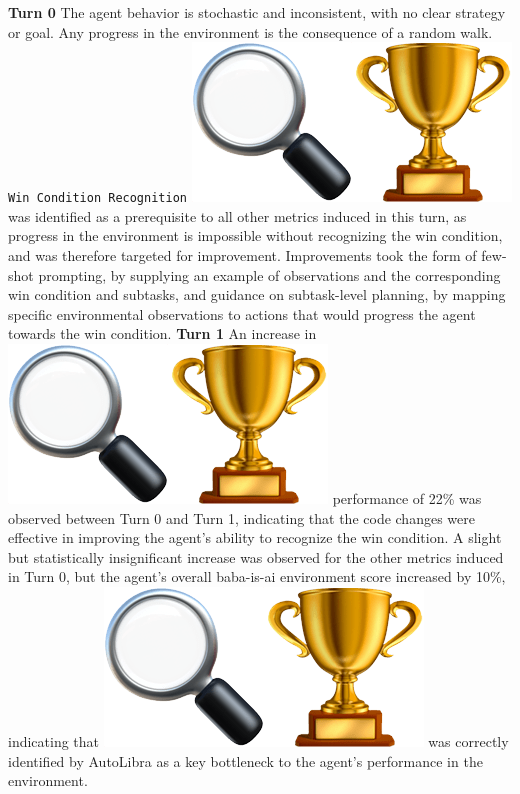 \textbf{Turn 0}
The agent behavior is stochastic and inconsistent, with no clear strategy or goal. Any progress in the environment is the consequence of a random walk. 
\texttt{Win Condition Recognition} \includegraphics[scale=0.07]{figs/emojis/emoji_1.png} was identified as a prerequisite to all other metrics induced in this turn, as progress in the environment is impossible without recognizing the win condition, and was therefore targeted for improvement. Improvements took the form of few-shot prompting, by supplying an example of observations and the corresponding win condition and subtasks, and guidance on subtask-level planning, by mapping specific environmental observations to actions that would progress the agent towards the win condition.
\newline
\textbf{Turn 1}
An increase in \includegraphics[scale=0.07]{figs/emojis/emoji_1.png} performance of 22\% was observed between Turn 0 and Turn 1, indicating that the code changes were effective in improving the agent's ability to recognize the win condition. A slight but statistically insignificant increase was observed for the other metrics induced in Turn 0, but the agent's overall baba-is-ai environment score increased by 10\%, indicating that \includegraphics[scale=0.07]{figs/emojis/emoji_1.png} was correctly identified by AutoLibra as a key bottleneck to the agent's performance in the environment.


